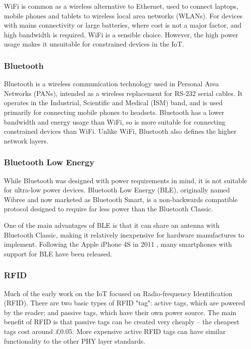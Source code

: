 \documentclass[10pt,journal,compsoc]{IEEEtran}
\begin{document}
WiFi is common as a wireless alternative to Ethernet, used to connect laptops,
mobile phones and tablets to wireless local area networks (WLANs). For devices
with mains connectivity or large batteries, where cost is not a major factor,
and high bandwidth is required, WiFi is a sensible choice. However, the high
power usage makes it unsuitable for constrained devices in the IoT.

\subsubsection{Bluetooth}
Bluetooth is a wireless communication technology used in Personal Area Networks
(PANs), intended as a wireless replacement for RS-232 serial cables. It
operates in the Industrial, Scientific and Medical (ISM) band, and is used
primarily for connecting mobile phones to headsets. Bluetooth has a lower
bandwidth and energy usage than WiFi, so is more suitable for connecting
constrained devices than WiFi. Unlike WiFi, Bluetooth also defines the higher
network layers. 

\subsubsection{Bluetooth Low Energy}
While Bluetooth was designed with power requirements in mind, it is not
suitable for ultra-low power devices. Bluetooth Low Energy (BLE), originally
named Wibree and now marketed as Bluetooth Smart, is a non-backwards
compatible protocol designed to require far less power than the Bluetooth
Classic. 

One of the main advantages of BLE is that it can share an antenna with
Bluetooth Classic, making it relatively inexpensive for hardware manufactures
to implement.  Following the Apple iPhone 4S in 2011 \cite{Engadget2011}, many
smartphones with support for BLE have been released.

\subsubsection{RFID}
Much of the early work on the IoT focused on Radio-frequency Identification
(RFID). There are two basic types of RFID "tag": active tags, which are powered
by the reader; and passive tags, which have their own power source. The main
benefit of RFID is that passive tags can be created very cheaply -- the
cheapest tags cost around \pounds0.05. More expensive active RFID tags can
have similar functionality to the other PHY layer standards. 
\end{document}
